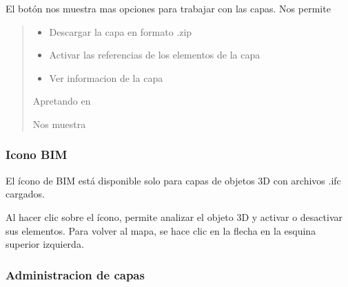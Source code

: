 \documentclass[a4paper,11pt,openany,spanish]{sphinxmanual}
\begin{document}
\sphinxAtStartPar
El botón \sphinxstylestrong{+} nos muestra mas opciones para trabajar con las capas. Nos permite
\begin{quote}
\begin{itemize}
\item {} 
\sphinxAtStartPar
Descargar la capa en formato .zip

\end{itemize}

\noindent{}
\begin{itemize}
\item {} 
\sphinxAtStartPar
Activar las referencias de los elementos de la capa

\end{itemize}

\noindent{}
\begin{itemize}
\item {} 
\sphinxAtStartPar
Ver informacion de la capa

\end{itemize}

\sphinxAtStartPar
Apretando en

\noindent{}

\sphinxAtStartPar
Nos muestra

\noindent{}
\end{quote}


\subsubsection{Icono BIM}
\label{\detokenize{navigation/cards:icono-bim}}
\sphinxAtStartPar
El ícono de BIM está disponible solo para capas de objetos 3D con archivos .ifc cargados.

\noindent{}

\sphinxAtStartPar
Al hacer clic sobre el ícono, permite analizar el objeto 3D y activar o desactivar sus elementos. Para volver al mapa, se hace clic en la flecha en la esquina superior izquierda.

\noindent{}


\subsubsection{Administracion de capas}
\label{\detokenize{navigation/cards:administracion-de-capas}}
\end{document}
